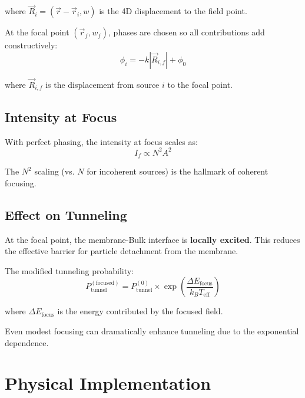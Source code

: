 \documentclass[12pt,a4paper]{article}
\begin{document}
where $\vec{R}_i = (\vec{r} - \vec{r}_i, w)$ is the 4D displacement to the field point.

At the focal point $(\vec{r}_f, w_f)$, phases are chosen so all contributions add constructively:
\begin{equation}
\phi_i = -k|\vec{R}_{i,f}| + \phi_0
\end{equation}

where $\vec{R}_{i,f}$ is the displacement from source $i$ to the focal point.

\subsection{Intensity at Focus}

With perfect phasing, the intensity at focus scales as:
\begin{equation}
I_f \propto N^2 A^2
\end{equation}

The $N^2$ scaling (vs. $N$ for incoherent sources) is the hallmark of coherent focusing.

\subsection{Effect on Tunneling}

At the focal point, the membrane-Bulk interface is \textbf{locally excited}. This reduces the effective barrier for particle detachment from the membrane.

The modified tunneling probability:
\begin{equation}
P_{\text{tunnel}}^{(\text{focused})} = P_{\text{tunnel}}^{(0)} \times \exp\left(\frac{\Delta E_{\text{focus}}}{k_B T_{\text{eff}}}\right)
\end{equation}

where $\Delta E_{\text{focus}}$ is the energy contributed by the focused field.

\begin{keyresult}
Even modest focusing can dramatically enhance tunneling due to the exponential dependence.
\end{keyresult}

\section{Physical Implementation}
\end{document}
